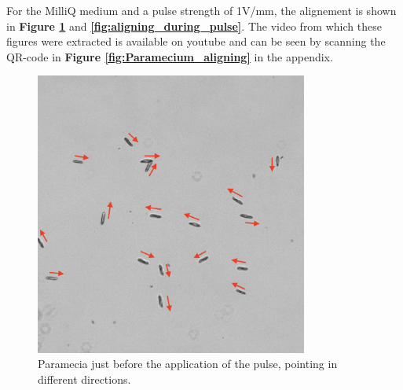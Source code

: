 For the MilliQ medium and a pulse strength of 1V/mm, the alignement is shown in \textbf{Figure \ref{fig:aligning_before}} and \textbf{\ref{fig:aligning_during_pulse}}. The video from which these figures were extracted is available on youtube and can be seen by scanning the QR-code in \textbf{Figure \ref{fig:Paramecium_aligning}} in the appendix. 

\noindent
\begin{minipage}{0.49\textwidth}
\begin{figure}[H]
\centering 
\captionsetup{width=0.9\linewidth, justification=centering}
\includegraphics[width=0.8\textwidth]{Figures/aligning_before.png}
\caption{Paramecia just before the application of the pulse, pointing in different directions.}
\label{fig:aligning_before}
\end{figure}
\end{minipage}
\hfill
